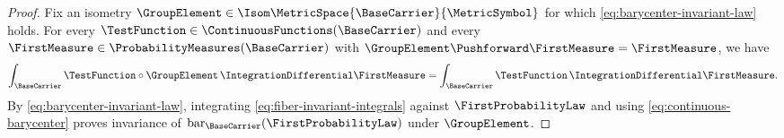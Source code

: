 \begin{proof}
Fix an isometry
$\GroupElement\in\Isom\MetricSpace{\BaseCarrier}{\MetricSymbol}$
for which \eqref{eq:barycenter-invariant-law} holds.
For every
$\TestFunction\in\ContinuousFunctions(\BaseCarrier)$
and every
$\FirstMeasure\in\ProbabilityMeasures(\BaseCarrier)$
with
$\GroupElement\Pushforward\FirstMeasure=\FirstMeasure$,
we have
\begin{equation}\label{eq:fiber-invariant-integrals}
 \int_\BaseCarrier\TestFunction\circ\GroupElement\,
       \IntegrationDifferential\FirstMeasure
 =\int_\BaseCarrier\TestFunction\,
       \IntegrationDifferential\FirstMeasure.
\end{equation}
By \eqref{eq:barycenter-invariant-law},
integrating \eqref{eq:fiber-invariant-integrals} against
$\FirstProbabilityLaw$
and using \eqref{eq:continuous-barycenter} proves invariance of
$\operatorname{bar}_\BaseCarrier(\FirstProbabilityLaw)$
under
$\GroupElement$.
\end{proof}

